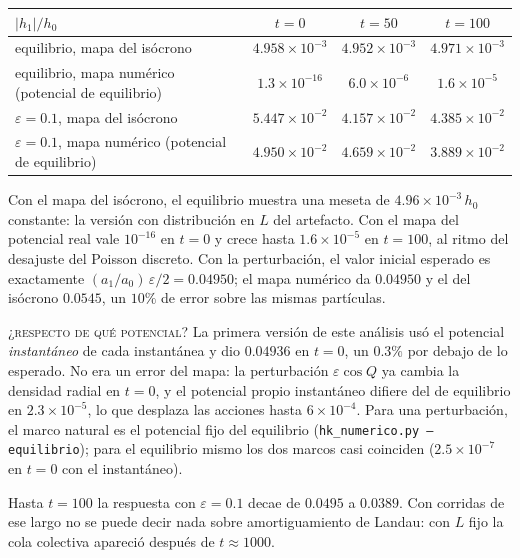 \documentclass[11pt,a4paper]{article}
\begin{document}
\begin{center}
\begin{tabular}{lccc}
\toprule
$|h_1|/h_0$ & $t=0$ & $t=50$ & $t=100$ \\
\midrule
equilibrio, mapa del isócrono & $4.958\times10^{-3}$ & $4.952\times10^{-3}$ & $4.971\times10^{-3}$ \\
equilibrio, mapa numérico (potencial de equilibrio) & $1.3\times10^{-16}$ & $6.0\times10^{-6}$ & $1.6\times10^{-5}$ \\
$\varepsilon=0.1$, mapa del isócrono & $5.447\times10^{-2}$ & $4.157\times10^{-2}$ & $4.385\times10^{-2}$ \\
$\varepsilon=0.1$, mapa numérico (potencial de equilibrio) & $4.950\times10^{-2}$ & $4.659\times10^{-2}$ & $3.889\times10^{-2}$ \\
\bottomrule
\end{tabular}
\end{center}

Con el mapa del isócrono, el equilibrio muestra una meseta de $4.96\times10^{-3}\,h_0$
constante: la versión con distribución en $L$ del artefacto. Con el mapa del potencial
real vale $10^{-16}$ en $t=0$ y crece hasta $1.6\times10^{-5}$ en $t=100$, al ritmo del
desajuste del Poisson discreto. Con la perturbación, el valor inicial esperado es
exactamente $(a_1/a_0)\,\varepsilon/2=0.04950$; el mapa numérico da $0.04950$ y el del
isócrono $0.0545$, un $10\%$ de error sobre las mismas partículas.

\begin{aviso}
\textsc{¿respecto de qué potencial?} La primera versión de este análisis usó el potencial
\emph{instantáneo} de cada instantánea y dio $0.04936$ en $t=0$, un $0.3\%$ por debajo de lo
esperado. No era un error del mapa: la perturbación $\varepsilon\cos Q$ ya cambia la
densidad radial en $t=0$, y el potencial propio instantáneo difiere del de equilibrio en
$2.3\times10^{-5}$, lo que desplaza las acciones hasta $6\times10^{-4}$. Para una
perturbación, el marco natural es el potencial fijo del equilibrio
(\texttt{hk\_numerico.py --equilibrio}); para el equilibrio mismo los dos marcos casi
coinciden ($2.5\times10^{-7}$ en $t=0$ con el instantáneo).
\end{aviso}

Hasta $t=100$ la respuesta con $\varepsilon=0.1$ decae de $0.0495$ a $0.0389$. Con corridas
de ese largo no se puede decir nada sobre amortiguamiento de Landau: con $L$ fijo la cola
colectiva apareció después de $t\approx1000$.
\end{document}
